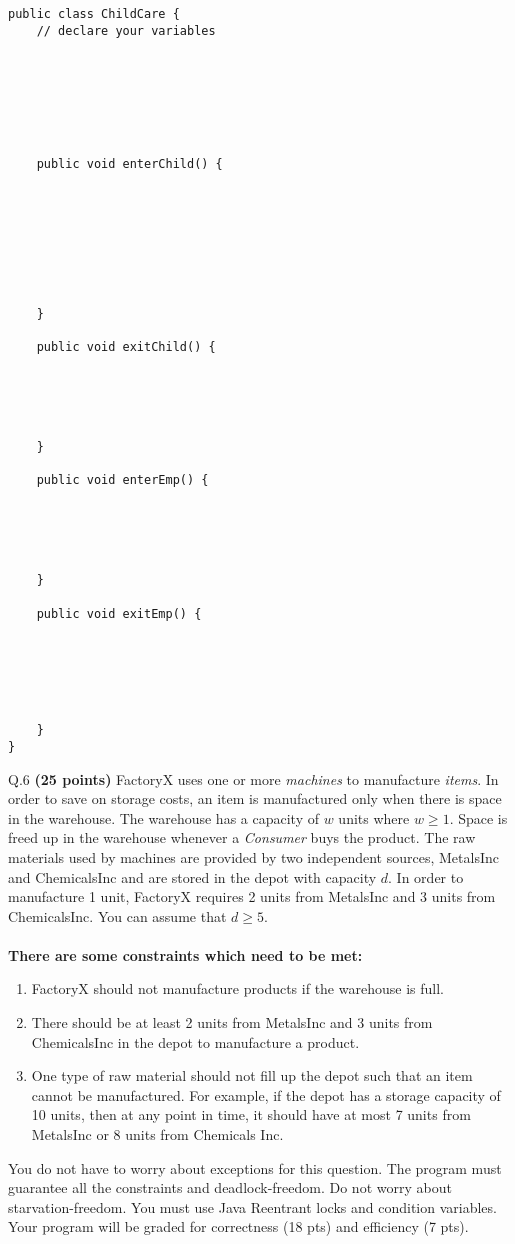 \documentclass[10pt]{article}
\begin{document}
{\small 
\begin{verbatim}
public class ChildCare {
    // declare your variables







    public void enterChild() {








    }
    
    public void exitChild() {





    }
    
    public void enterEmp() {





    }
    
    public void exitEmp() {
    





    }
}
\end{verbatim}
}
\pagebreak

\noindent
Q.6 {\bf (25 points)}
FactoryX uses one or more {\em machines} to manufacture {\em items}. 
In order to save on storage costs, an item is manufactured only when there is space in the warehouse.
The warehouse has a capacity of $w$ units where $w \geq 1$. 
Space is freed up in the warehouse whenever a {\em Consumer} buys the product. 
The raw materials used by machines are provided by two independent sources, 
MetalsInc and ChemicalsInc and are stored in the depot with capacity $d$. In order to manufacture 1 unit, FactoryX requires 2 units from MetalsInc and 3 units from ChemicalsInc. You can assume that
$d \geq 5$.
\\ \\
{\bf There are some constraints which need to be met:}
\begin{enumerate}
\item FactoryX should not manufacture products if the warehouse is full.
\item There should be at least 2 units from MetalsInc and 3 units from ChemicalsInc in the depot to manufacture a product.
\item One type of raw material should not fill up the depot such that an item cannot be manufactured. For example, if the depot has a storage capacity of 10 units, then at any point in time, it should have at most 7 units from MetalsInc  or 8 units from Chemicals Inc.
\end{enumerate}
You do not have to worry about exceptions for this question.
The program must guarantee all the constraints and deadlock-freedom. Do not worry about starvation-freedom.
You must use Java Reentrant locks and condition variables. 
Your program will be graded for correctness (18 pts) and efficiency (7 pts).
\end{document}
